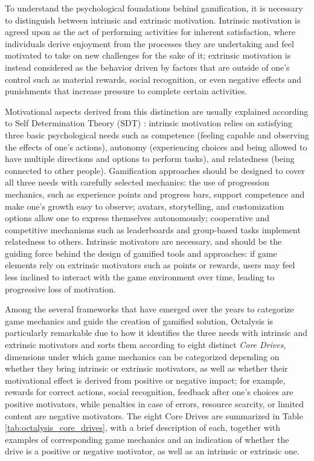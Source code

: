 To understand the psychological foundations behind gamification, it is necessary to distinguish between intrinsic and extrinsic motivation. Intrinsic motivation is agreed upon as the act of performing activities for inherent satisfaction, where individuals derive enjoyment from the processes they are undertaking and feel motivated to take on new challenges for the sake of it; extrinsic motivation is instead considered as the behavior driven by factors that are outside of one's control such as material rewards, social recognition, or even negative effects and punishments that increase pressure to complete certain activities.  

Motivational aspects derived from this distinction are usually explained according to Self Determination Theory (SDT) \cite{deci2000intrinsic, deci1985intrinsic}: intrinsic motivation relies on satisfying three basic psychological needs such as competence (feeling capable and observing the effects of one's actions), autonomy (experiencing choices and being allowed to have multiple directions and options to perform tasks), and relatedness (being connected to other people). Gamification approaches should be designed to cover all three needs with carefully selected mechanics: the use of progression mechanics, such as experience points and progress bars, support competence and make one's growth easy to observe; avatars, storytelling, and customization options allow one to express themselves autonomously; cooperative and competitive mechanisms such as leaderboards and group-based tasks implement relatedness to others. Intrinsic motivators are necessary, and should be the guiding force behind the design of gamified tools and approaches: if game elements rely on extrinsic motivators such as points or rewards, users may feel less inclined to interact with the game environment over time, leading to progressive loss of motivation.

Among the several frameworks that have emerged over the years to categorize game mechanics and guide the creation of gamified solution, Octalysis \cite{chou2015actionable} is particularly remarkable due to how it identifies the three needs with intrinsic and extrinsic motivators and sorts them according to eight distinct \textit{Core Drives}, dimensions under which game mechanics can be categorized depending on whether they bring intrinsic or extrinsic motivators, as well as whether their motivational effect is derived from positive or negative impact; for example, rewards for correct actions, social recognition, feedback after one's choices are positive motivators, while penalties in case of errors, resource scarcity, or limited content are negative motivators. The eight Core Drives are summarized in Table \ref{tab:octalysis_core_drives}, with a brief description of each, together with examples of corresponding game mechanics and an indication of whether the drive is a positive or negative motivator, as well as an intrinsic or extrinsic one.

